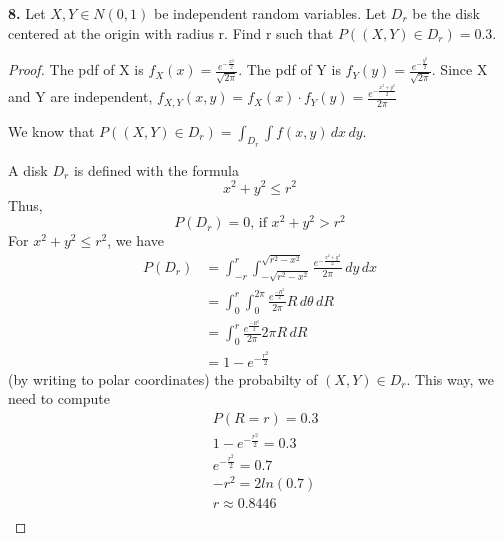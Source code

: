 \documentclass{article}
\begin{document}
\textbf{8.} Let $X, Y \in N(0, 1)$ be independent random variables. Let $D_r$ be the disk centered at the origin with radius r.
Find r such that $P((X, Y ) \in D_r) = 0.3$.

\begin{proof}
The pdf of X is $f_{X}(x) = \frac{e^{-\frac{{x}^{2}}{2}}}{\sqrt{2\pi}}$. 
The pdf of Y is $f_{Y}(y) = \frac{e^{-\frac{{y}^{2}}{2}}}{\sqrt{2\pi}}$.
Since X and Y are independent, $f_{X, Y}(x, y) = f_{X}(x) \cdot f_{Y}(y) = \frac{e^{-\frac{x^2 + y^2}{2}}}{2\pi}$

We know that $P((X, Y) \in D_r) = \int _{D_r} \int f(x, y) \, dx \, dy$.

A disk $D_r$ is defined with the formula \[ x^2 + y^2 \leq r^2 \]
Thus, \[ P(D_r) = 0 \text{, if } x^2 + y^2 > r^2 \]
For $x^2 + y^2 \leq r^2$, we have
\begin{equation*}
\begin{split}
    P(D_r) &= \int_{-r}^{r} \int_{-\sqrt{r^2 - x^2}}^{\sqrt{r^2 - x^2}} \frac{e^{-\frac{x^2 + y^2}{2}}}{2\pi} \, dy \, dx \\
    &= \int_{0}^{r} \int_{0}^{2\pi} \frac{e^\frac{-R^2}{2}}{2\pi} R \, d\theta \, dR \\
    &= \int_{0}^{r} \frac{e^\frac{-R^2}{2}}{2\pi} 2\pi R \, dR \\
    &= 1 - e^{-\frac{r^2}{2}}
\end{split}
\end{equation*}
(by writing to polar coordinates) the probabilty of $(X, Y) \in D_r$. This way, we need to compute \begin{equation*}
    \begin{split}
        & P(R = r) = 0.3 \\
        & 1 - e^{-\frac{r^2}{2}} = 0.3 \\
        & e^{-\frac{r^2}{2}} = 0.7 \\
        & -r^2 = 2 ln(0.7) \\
        & r \approx 0.8446 \\
    \end{split}
\end{equation*}
\end{proof}
\end{document}
